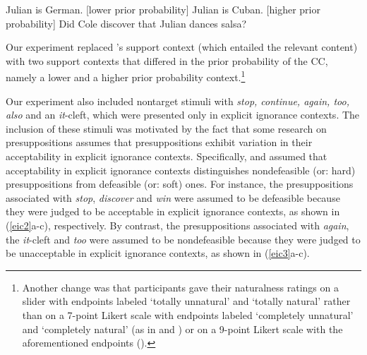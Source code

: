 \documentclass[11pt,fleqn]{article}
\newcommand{\6}{\mbox{$[\hspace*{-.6mm}[$}}
\newcommand{\9}{\mbox{$]\hspace*{-.6mm}]$}}
\newcommand{\citepos}[1]{\citeauthor{#1}'s \citeyear{#1}}
\begin{document}
\begin{exe}
\ex\label{prior}
\begin{xlist}
\ex Julian is German. \hfill [lower prior probability]
\ex Julian is Cuban. \hfill [higher prior probability]
\ex Did Cole discover that Julian dances salsa?
\end{xlist}
\end{exe}
Our experiment replaced \citepos{mandelkern-etal2020} support context (which entailed the relevant content) with two support contexts that differed in the prior probability of the CC, namely a lower and a higher prior probability context.\footnote{Another change was that participants gave their naturalness ratings on a slider with endpoints labeled `totally unnatural' and `totally natural' rather than on a 7-point Likert scale with endpoints labeled `completely unnatural' and `completely natural' (as in \citealt[Exp.3]{mandelkern-etal2020} and \citealt[Exp.~1]{kalomoiros-schwarz2024}) or on a 9-point Likert scale with the aforementioned endpoints (\citealt[Exp.~2]{kalomoiros-schwarz2024}).} %

Our experiment also included nontarget stimuli with \emph{stop, continue, again, too, also} and an {\em it}-cleft, which were presented only in explicit ignorance contexts. The inclusion of these stimuli was motivated by the fact that some research on presuppositions assumes that presuppositions exhibit variation in their acceptability in explicit ignorance contexts. Specifically, \citealt{simons01} and \citealt{abusch10} assumed that acceptability in explicit ignorance contexts distinguishes nondefeasible (or: hard) presuppositions from defeasible (or: soft) ones. For instance, the presuppositions associated with \emph{stop}, \emph{discover} and \emph{win} were assumed to be defeasible because they were judged to be acceptable in explicit ignorance contexts, as shown in (\ref{eic2}a-c), respectively. By contrast, the presuppositions associated with \emph{again}, the \emph{it}-cleft and \emph{too} were assumed to be nondefeasible because they were judged to be unacceptable in explicit ignorance contexts, as shown in (\ref{eic3}a-c).
\end{document}
